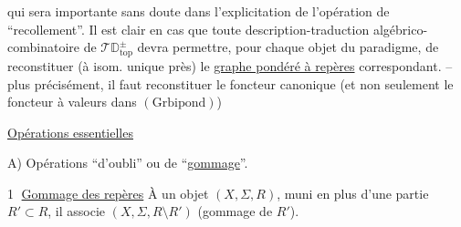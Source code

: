 qui sera importante sans doute dans l'explicitation de l'opération de ``recollement''. Il est clair en  cas que toute description-traduction algébrico-combinatoire de $\mathscr T\mathbb D_{\mathrm{top}}^{\pm}$ devra permettre, pour chaque objet du  paradigme, de reconstituer (à isom. unique près) le \uline{graphe pondéré à repères} correspondant. -- plus précisément, il faut reconstituer le foncteur canonique
(et non seulement le foncteur à valeurs dans $(\mathrm{Grbipond})$)

\uline{Opérations essentielles}

A) Opérations ``d'oubli'' ou de ``\uline{gommage}''.

\textcircled{1} \uline{Gommage des repères} À un objet $(X,\Sigma,R)$, muni en plus d'une partie $R'\subset R$, il associe $(X,\Sigma,R\setminus R')$ (gommage de $R'$).

